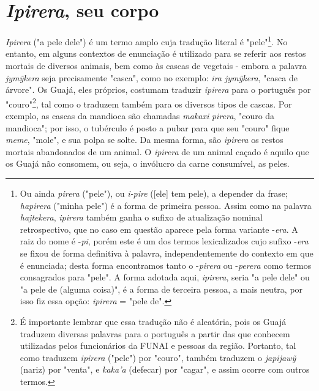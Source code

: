 \section{\emph{Ipirera}, seu
corpo}\label{ipirera-seu-corpo}

\emph{Ipirera} ("a pele dele") é um termo amplo cuja tradução literal é
"pele"\footnote{Ou ainda \emph{pirera} ("pele"), ou \emph{i-pire}
  ({[}ele{]} tem pele), a depender da frase; \emph{hapirera} ("minha
  pele") é a forma de primeira pessoa. Assim como na palavra
  \emph{hajtekera}, \emph{ipirera} também ganha o sufixo de atualização
  nominal retrospectivo, que no caso em questão aparece pela forma
  variante -\emph{era}. A raiz do nome é -\emph{pi}, porém este é um dos
  termos lexicalizados cujo sufixo -\emph{era} se fixou de forma
  definitiva à palavra, independentemente do contexto em que é
  enunciada; desta forma encontramos tanto o -\emph{pirera} ou
  -\emph{perera} como termos consagrados para "pele". A forma adotada
  aqui, \emph{ipirera}, seria "a pele dele" ou "a pele de (alguma
  coisa)", é a forma de terceira pessoa, a mais neutra, por isso fiz
  essa opção: \emph{ipirera} = "pele de".}. No entanto, em alguns
contextos de enunciação é utilizado para se referir aos restos mortais
de diversos animais, bem como às cascas de vegetais - embora a palavra
\emph{jymỹkera} seja precisamente "casca", como no exemplo: \emph{ira
jymỹkera}, "casca de árvore". Os Guajá, eles próprios, costumam traduzir
\emph{ipirera} para o português por "couro"\footnote{É importante
  lembrar que essa tradução não é aleatória, pois os Guajá traduzem
  diversas palavras para o português a partir das que conhecem
  utilizadas pelos funcionários da FUNAI e pessoas da região. Portanto,
  tal como traduzem \emph{ipirera} ("pele") por "couro", também traduzem
  o \emph{japijawỹ} (nariz) por "venta", e \emph{kaka'a} (defecar) por
  "cagar", e assim ocorre com outros termos.}, tal como o traduzem
também para os diversos tipos de cascas. Por exemplo, as cascas da
mandioca são chamadas \emph{makaxi} \emph{pirera}, "couro da mandioca";
por isso, o tubérculo é posto a pubar para que seu "couro" fique
\emph{meme}, "mole", e sua polpa se solte. Da mesma forma, são
\emph{ipirera} os restos mortais abandonados de um animal. O
\emph{ipirera} de um animal caçado é aquilo que os Guajá não consomem,
ou seja, o invólucro da carne consumível, as peles.

